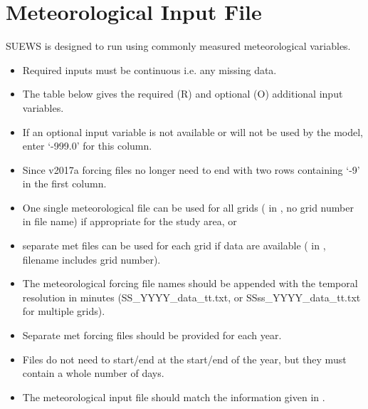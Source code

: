 \documentclass[letterpaper,10pt,english]{sphinxmanual}
\begin{document}
\section{Meteorological Input File}
\label{\detokenize{input_files/met_input::doc}}\label{\detokenize{input_files/met_input:meteorological-input-file}}
SUEWS is designed to run using commonly measured meteorological
variables.
\begin{itemize}
\item {} 
Required inputs must be continuous \textendash{} i.e.  any missing
data.

\item {} 
The table below gives the required (R) and optional (O) additional
input variables.

\item {} 
If an optional input variable is not available or will not be used by
the model, enter ‘-999.0’ for this column.

\item {} 
Since v2017a forcing files no longer need to end with two rows
containing ‘-9’ in the first column.

\item {} 
One single meteorological file can be used for all grids
( in {\hyperref[\detokenize{input_files/RunControl/RunControl:runcontrol-nml}]{}}, no
grid number in file name) if appropriate for the study area, or

\item {} 
separate met files can be used for each grid if data are available
( in {\hyperref[\detokenize{input_files/RunControl/RunControl:runcontrol-nml}]{}},
filename includes grid number).

\item {} 
The meteorological forcing file names should be appended with the
temporal resolution in minutes (SS\_YYYY\_data\_tt.txt, or
SSss\_YYYY\_data\_tt.txt for multiple grids).

\item {} 
Separate met forcing files should be provided for each year.

\item {} 
Files do not need to start/end at the start/end of the year, but they
must contain a whole number of days.

\item {} 
The meteorological input file should match the information given in
{\hyperref[\detokenize{input_files/SUEWS_SiteInfo/SUEWS_SiteSelect:suews-siteselect-txt}]{}}.


\end{itemize}
\end{document}
